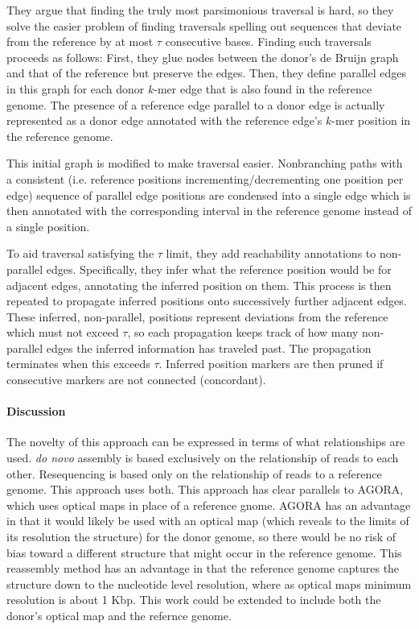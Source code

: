 They argue that finding the truly most parsimonious traversal is hard, so they solve the easier problem of finding traversals spelling out sequences that deviate from the reference by at most $\tau$ consecutive bases.
Finding such traversals proceeds as follows: First, they glue nodes between the donor's de Bruijn graph and that of the reference but preserve the edges.
Then, they define parallel edges in this graph for each donor $k$-mer edge that is also found in the reference genome.
The presence of a reference edge parallel to a donor edge is actually represented as a donor edge annotated with the reference edge's $k$-mer position in the reference genome.  

This initial graph is modified to make traversal easier.
Nonbranching paths with a consistent (i.e. reference positions incrementing/decrementing one position per edge) sequence of parallel edge positions are condensed into a single edge which is then annotated with the corresponding interval in the reference genome instead of a single position.  

To aid traversal satisfying the $\tau$ limit, they add reachability annotations to non-parallel edges.%
Specifically, they infer what the reference position would be for adjacent edges, annotating the inferred position on them.
This process is then repeated to propagate inferred positions onto successively further adjacent edges.
These inferred, non-parallel, positions represent deviations from the reference which must not exceed $\tau$, so each propagation keeps track of how many non-parallel edges the inferred information has traveled past.
The propagation terminates when this exceeds $\tau$.
Inferred position markers are then pruned if consecutive markers are not connected (concordant).


\paragraph{Discussion}

The novelty of this approach can be expressed in terms of what relationships are used.  \emph{do novo} assembly is based exclusively on the relationship of reads to each other. Resequencing is based only on the relationship of reads to a reference genome.  This approach uses both.  This approach has clear parallels to AGORA, which uses optical maps in place of a reference gnome.   AGORA has an advantage in that it would likely be used with an optical map (which reveals to the limits of its resolution the structure) for the donor genome,  so there would be no risk of bias toward a different structure that might occur in the reference genome.  This reassembly method has an advantage in that the reference genome captures the structure down to the nucleotide level resolution, where as optical maps minimum resolution is about 1 Kbp.  This work could be extended to include both the donor's optical map and the refernce genome.

